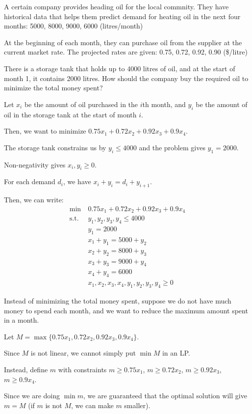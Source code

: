 \documentclass[class=co250,tikz,notes]{agony}
\begin{document}
\begin{example}
  A certain company provides heading oil for the local commnity. They have historical data that helps them predict demand for heating oil in the next four months: 5000, 8000, 9000, 6000 (litres/month)

  At the beginning of each month, they can purchase oil from the supplier at the current market rate. The projected rates are given: 0.75, 0.72, 0.92, 0.90 (\$/litre)

  There is a storage tank that holds up to 4000 litres of oil, and at the start of month 1, it contains 2000 litres. How should the company buy the required oil to minimize the total money spent?
\end{example}
\begin{sol}
  Let $x_i$ be the amount of oil purchased in the $i$th month, and $y_i$ be the amount of oil in the storage tank at the start of month $i$.

  Then, we want to minimize $0.75x_1 + 0.72x_2 + 0.92x_3 + 0.9x_4$.

  The storage tank constrains us by $y_i \leq 4000$ and the problem gives $y_1 = 2000$.

  Non-negativity gives $x_i, y_i \geq 0$.

  For each demand $d_i$, we have $x_i + y_i = d_i + y_{i+1}$.

  Then, we can write:
  \begin{align*}
    \min\         & 0.75x_1 + 0.72x_2 + 0.92x_3 + 0.9x_4   \\
    \text{s.t.}\  & y_1, y_2, y_3, y_4 \leq 4000           \\
                  & y_1 = 2000                             \\ & x_1 + y_1 = 5000 + y_2 \\
                  & x_2 + y_2 = 8000 + y_3                 \\
                  & x_3 + y_3 = 9000 + y_4                 \\
                  & x_4 + y_4 = 6000                       \\
                  & x_1,x_2,x_3,x_4,y_1,y_2,y_3,y_4 \geq 0
  \end{align*}
\end{sol}

\begin{example}
  Instead of minimizing the total money spent, suppose we do not have much money to spend each month, and we want to reduce the maximum amount spent in a month.
\end{example}
\begin{sol}
  Let $M = \max \{0.75x_1, 0.72x_2, 0.92x_3, 0.9x_4\}$.

  Since $M$ is not linear, we cannot simply put $\min M$ in an LP.

  Instead, define $m$ with constraints $m \geq 0.75x_1$, $m \geq 0.72x_2$, $m \geq 0.92x_3$, $m \geq 0.9x_4$.

  Since we are doing $\min m$, we are guaranteed that the optimal solution will give $m = M$ (if $m$ is not $M$, we can make $m$ smaller).
\end{sol}
\end{document}
